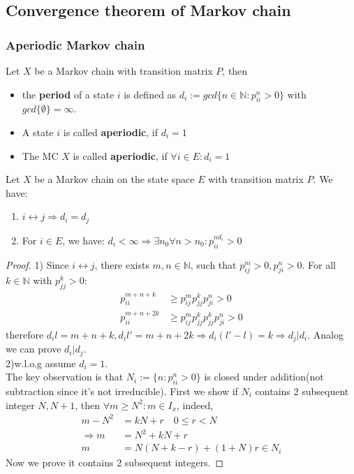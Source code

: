 \begin{example}
	
\end{example}





\subsection{Convergence theorem of Markov chain}
\subsubsection*{Aperiodic Markov chain}
\begin{definition}
	Let $X$ be a Markov chain with transition matrix $P$, then
	\begin{itemize}
		\item the \textbf{period} of a state $i$ is defined as $d_i:= gcd\{n \in \mathbb{N}: p_{ii}^n > 0 \}$ with $gcd\{\emptyset\} = \infty$.
		\item A state $i$ is called \textbf{aperiodic}, if $d_i = 1$ 
		\item The MC $X$ is called \textbf{aperiodic}, if $\forall i \in E: d_i = 1$
	\end{itemize}
\end{definition}

\begin{lemma}
	Let $X$ be a Markov chain on the state space $E$ with transition matrix $P$. We have:
	\begin{enumerate}
		\item $i \leftrightarrow j \Rightarrow d_i = d_j$
		\item For $i \in E$, we have: $d_i < \infty \Rightarrow \exists n_0 \forall n > n_0: p_{ii}^{nd_i} > 0$
	\end{enumerate}
\end{lemma}
\begin{proof}1)
	Since $i\leftrightarrow j$, there exists $m, n \in \mathbb{N}$, such that $p_{ij}^m > 0, p_{ji}^n>0$. For all $k \in \mathbb{N}$ with $p_{jj}^k >0:$
	\begin{align*}
		p_{ii}^{m + n + k} &\ge p_{ij}^m p_{jj}^k p_{ji}^n > 0\\
		p_{ii}^{m+n+2k} &\ge p_{ij}^m p_{jj}^k p_{jj}^k p_{ji}^n >0
	\end{align*}
	therefore $d_il = m+n+k, d_i l' = m + n + 2k \Rightarrow d_i (l'- l) = k \Rightarrow d_j | d_i$. Analog we can prove $d_i | d_j$.\\
	2)w.l.o.g assume $d_i = 1$.\\
	The key observation is that $N_i:= \{n: p_{ii}^n > 0\}$ is closed under addition(not subtraction since it's not irreducible). First we show if $N_i$ contains 2 subsequent integer $N, N+1$, then $\forall m \geq N^2: m \in I_x$, indeed,
	\begin{align*}
		m - N^2 &= kN + r \quad 0 \le r < N\\
		\Rightarrow 
		m &= N^2 + kN + r\\
		m &= N(N + k -r) + (1 + N) r \in N_i
	\end{align*}
	Now we prove it contains 2 subsequent integers. 
\end{proof}

